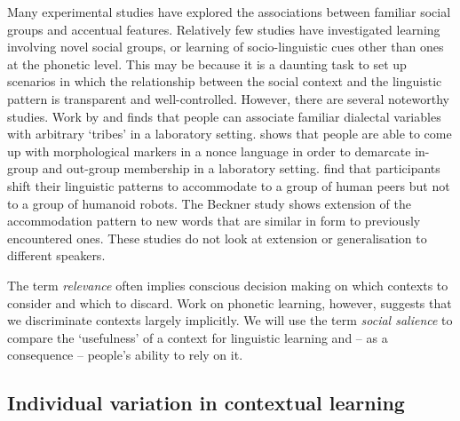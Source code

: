 \documentclass{frontiersSCNS} %
\begin{document}
Many experimental studies have explored the associations between familiar social groups and accentual features. Relatively few studies have investigated learning involving novel social groups, or learning of socio-linguistic cues other than ones at the phonetic level. This may be because it is a daunting task to set up scenarios in which the relationship between the social context and the linguistic pattern is transparent and well-controlled. However, there are several noteworthy studies. Work by \cite{docherty2013} and \cite{langstrof2014} finds that people can associate familiar dialectal variables with arbitrary `tribes' in a laboratory setting. \cite{roberts2008} shows that people are able to come up with morphological markers in a nonce language in order to demarcate in-group and out-group membership in a laboratory setting.  \cite{beckner2015conformity} find that participants shift their linguistic patterns to accommodate to a group of human peers but not to a group of humanoid robots. The Beckner study shows extension of the accommodation pattern to new words that are similar in form to previously encountered ones. These studies do not look at extension or generalisation to different speakers. 

The term \emph{relevance} often implies conscious decision making on which contexts to consider and which to discard. Work on phonetic learning, however, suggests that we discriminate contexts largely implicitly. We will use the term \emph{social salience} to compare the `usefulness' of a context for linguistic learning and -- as a consequence -- people's ability to rely on it. 

\subsection{Individual variation in contextual learning}
\end{document}
